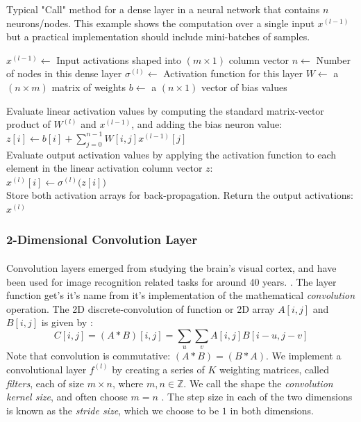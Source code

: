 \documentclass[12pt,letterpaper]{article}
\begin{document}
\begin{algorithm}[H]
\caption{Typical "Call" method for a dense layer in a neural network that contains $n$ neurons/nodes. This example shows the computation over a single input $x^{(l-1)}$ but a practical implementation should include mini-batches of samples.}
\label{alg-CallDense}

\begin{algorithmic}
\REQUIRE $x^{(l-1)} \leftarrow$ Input activations shaped into $(m \times 1)$ column vector
\REQUIRE $n \leftarrow$ Number of nodes in this dense layer
\REQUIRE $\sigma^{(l)} \leftarrow$ Activation function for this layer
\REQUIRE $W \leftarrow$ a $(n \times m)$ matrix of weights
\REQUIRE $b \leftarrow$ a $(n \times 1)$ vector of bias values

Evaluate linear activation values by computing the standard matrix-vector product of $W^{(l)}$ and $x^{(l-1)}$, and adding the bias neuron value:\\
$z[i] \leftarrow b[i] + \sum_{j=0}^{n-1} W[i,j] x^{(l-1)}[j]$ \\
Evaluate output activation values by applying the activation function to each element in the linear activation column vector $z$:\\
$x^{(l)}[i] \leftarrow \sigma^{(l)}\big( z[i] \big)$ \\

Store both activation arrays for back-propagation. Return the output activations:\\
\RETURN $x^{(l)}$

\end{algorithmic}
\end{algorithm}


\subsubsection{2-Dimensional Convolution Layer}
\label{subsubsec-Conv2DLayer}

\paragraph*{}Convolution layers emerged from studying the brain's visual cortex, and have been used for image recognition related tasks for around 40 years. \cite{Geron,Loy}. The layer function get's it's name from it's implementation of the mathematical \textit{convolution} operation. The 2D discrete-convolution of function or 2D array $A[i,j]$ and $B[i,j]$ is given by \cite{Goodfellow}:
\begin{equation}
\label{eqn-convolution}
C[i,j] = (A * B)[i,j] = \sum_{u}\sum_{v} A[i,j]B[i - u,j - v]
\end{equation}
Note that convolution is commutative: $(A * B) = (B * A)$. We implement a convolutional layer $f^{(l)}$ by creating a series of $K$ weighting matrices, called \textit{filters}, each of size $m \times n$, where $m,n \in \mathbb{Z}$. We call the shape the \textit{convolution kernel size}, and often choose $m = n$ \cite{Loy, Goodfellow}. The step size in each of the two dimensions is known as the \textit{stride size}, which we choose to be $1$ in both dimensions.
\end{document}
